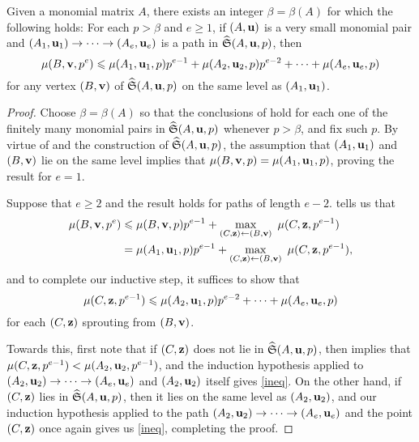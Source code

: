 \documentclass[11pt]{amsart}
\begin{document}
\begin{lemma}\label{lem: upper bound for higher mu}
   Given a monomial matrix $A$, there exists an integer $\beta= \beta(A)$ for which the following holds\textup:
   For each $p>\beta$ and $e\ge 1$, if $(A, \mathbf{u})$ is a very small monomial pair and $(A_1, \mathbf{u}_1) \to \cdots \to (A_e, \mathbf{u}_e)$ is a path in $\widehat{\mathfrak{S}}(A, \mathbf{u}, p)$,  then 
   \[
      \mu(B, \mathbf{v}, p^e) \leqslant \mu(A_1, \mathbf{u}_1, p)p^{e-1} + \mu(A_2, \mathbf{u}_2, p)p^{e-2} + \cdots + \mu(A_{e}, \mathbf{u}_{e}, p)
   \]
   for any vertex $(B, \mathbf{v})$ of $\widehat{\mathfrak{S}}(A, \mathbf{u}, p)$ on the same level as $(A_1, \mathbf{u}_1)$.
\end{lemma}

\begin{proof}
   Choose $\beta = \beta(A)$ so that the conclusions of   hold for each one of the finitely many monomial pairs in $\widehat{\mathfrak{S}}(A, \mathbf{u},p)$ whenever $p > \beta$, and fix such $p$.
    By virtue of  and the construction of $\widehat{\mathfrak{S}}(A,\mathbf{u},p)$, the assumption that $(A_1, \mathbf{u}_1)$ and $(B, \mathbf{v})$ lie on the same level implies that $\mu(B,\mathbf{v},p) = \mu(A_1, \mathbf{u}_1, p)$, proving the result for $e = 1$.

    Suppose that $e \geq 2$ and the result holds for paths of length $e-2$.
     tells us that
    \begin{align*}
      \mu(B,\mathbf{v},p^e) &\leqslant \mu(B,\mathbf{v},p) p^{e-1} + \max_{(C,\mathbf{z}) \leftarrow (B,\mathbf{v})} \ \mu(C,\mathbf{z},p^{e-1}) \\
      &= \mu(A_1,\mathbf{u}_1,p) p^{e-1} + \max_{(C,\mathbf{z}) \leftarrow (B,\mathbf{v})} \ \mu(C,\mathbf{z},p^{e-1}),
    \end{align*}
    and to complete our inductive step, it suffices to show that
    \begin{equation}\label{ineq}
        \mu(C,\mathbf{z},p^{e-1}) \leqslant \mu(A_2,\mathbf{u}_1,p) p^{e-2} + \cdots + \mu(A_e,\mathbf{u}_e,p)
    \end{equation}
    for each $(C,\mathbf{z})$ sprouting from $(B,\mathbf{v})$.
    
    Towards this, first note that if $(C, \mathbf{z})$ does not lie in $\widehat{\mathfrak{S}}(A,\mathbf{u},p)$, then  implies that $\mu(C, \mathbf{z},p^{e-1}) < \mu(A_2,\mathbf{u}_2, p^{e-1})$, and the induction hypothesis applied to $(A_2, \mathbf{u}_2) \to \cdots \to (A_e, \mathbf{u}_e)$ and $(A_2,\mathbf{u}_2)$ itself gives \eqref{ineq}.
    On the other hand, if $(C, \mathbf{z})$ lies in $\widehat{\mathfrak{S}}(A, \mathbf{u},p)$, then it lies on the same level as $(A_2, \mathbf{u}_2)$, and  our induction hypothesis applied to the path $(A_2, \mathbf{u}_2) \to \cdots \to (A_e, \mathbf{u}_e)$ and the point $(C, \mathbf{z})$ once again gives us \eqref{ineq}, completing the proof.
\end{proof}
\end{document}
